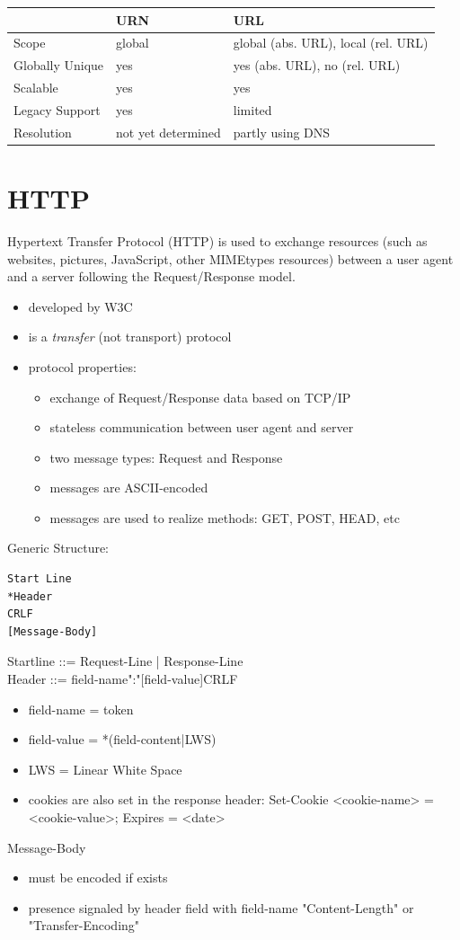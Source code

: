 \documentclass[11pt]{article}
\begin{document}
\begin{center}
\begin{tabular}{lll}
 & URN & URL\\
\hline
Scope & global & global (abs. URL), local (rel. URL)\\
Globally Unique & yes & yes (abs. URL), no (rel. URL)\\
Scalable & yes & yes\\
Legacy Support & yes & limited\\
Resolution & not yet  determined & partly using DNS\\
\end{tabular}
\end{center}

\section{HTTP}
\label{sec:org08ad9e6}
Hypertext Transfer Protocol (HTTP) is used to exchange resources (such as websites, pictures, JavaScript, other MIMEtypes resources) between a user agent and a server following the Request/Response model.
\begin{itemize}
\item developed by W3C
\item is a \emph{transfer} (not transport) protocol
\item protocol properties:
\begin{itemize}
\item exchange of Request/Response data based on TCP/IP
\item stateless communication between user agent and server
\item two message types: Request and Response
\item messages are ASCII-encoded
\item messages are used to realize methods: GET, POST, HEAD, etc
\end{itemize}
\end{itemize}

Generic Structure:
\lstset{breaklines=true,language=sh,label= ,caption= ,captionpos=b,numbers=none}
\begin{lstlisting}
Start Line
*Header
CRLF
[Message-Body]
\end{lstlisting}
Startline ::= Request-Line | Response-Line\\
Header ::= field-name":"[field-value]CRLF
\begin{itemize}
\item field-name = token
\item field-value = *(field-content|LWS)
\item LWS = Linear White Space
\item cookies are also set in the response header: Set-Cookie <cookie-name> = <cookie-value>; Expires = <date>
\end{itemize}
Message-Body
\begin{itemize}
\item must be encoded if exists
\item presence signaled by header field with field-name "Content-Length" or "Transfer-Encoding"
\end{itemize}
\end{document}
